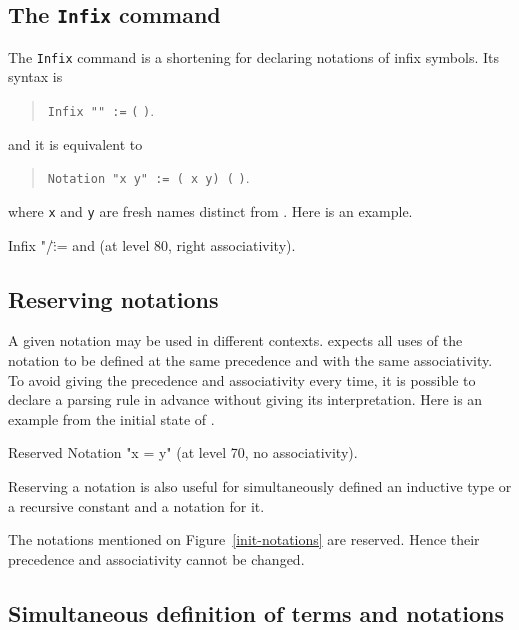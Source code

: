 \subsection{The \texttt{Infix} command
}

The \texttt{Infix} command is a shortening for declaring notations of
infix symbols. Its syntax is 

\begin{quote}
\noindent\texttt{Infix "{\symbolentry}" :=} {\qualid} {\tt (}  {\tt )}.
\end{quote}

and it is equivalent to

\begin{quote}
\noindent\texttt{Notation "x {\symbolentry} y" := ({\qualid} x y)  (}  {\tt )}.
\end{quote}

where {\tt x} and {\tt y} are fresh names distinct from {\qualid}. Here is an example.

\begin{coq_example*}
Infix "/\" := and (at level 80, right associativity).
\end{coq_example*}

\subsection{Reserving notations
\label{ReservedNotation}
}

A given notation may be used in different contexts. {\Coq} expects all
uses of the notation to be defined at the same precedence and with the
same associativity. To avoid giving the precedence and associativity
every time, it is possible to declare a parsing rule in advance
without giving its interpretation. Here is an example from the initial
state of {\Coq}.

\begin{coq_example}
Reserved Notation "x = y" (at level 70, no associativity).
\end{coq_example}

Reserving a notation is also useful for simultaneously defined an
inductive type or a recursive constant and a notation for it.

\Rem The notations mentioned on Figure~\ref{init-notations} are
reserved. Hence their precedence and associativity cannot be changed.

\subsection{Simultaneous definition of terms and notations
}

